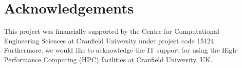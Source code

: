 \documentclass[review]{elsarticle}
\begin{document}
\section*{Acknowledgements}
This project was financially supported by the Centre for Computational Engineering Sciences at Cranfield University under project code 15124. Furthermore, we would like to acknowledge the IT support for using the High-Performance Computing (HPC) facilities at Cranfield University, UK.



{\begingroup
\singlespacing
\footnotesize

\endgroup}
\end{document}
